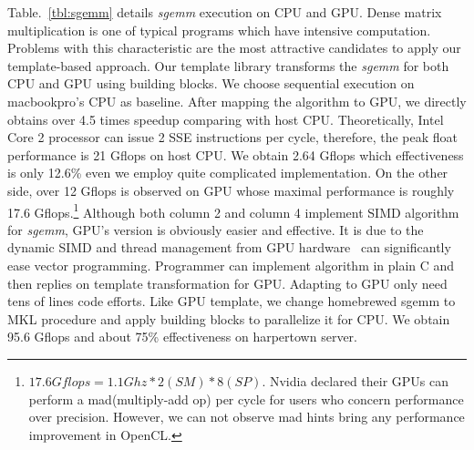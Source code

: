 Table.~\ref{tbl:sgemm} details \textit{sgemm} execution on CPU and GPU. Dense matrix
multiplication is one of  typical programs which have
intensive computation. Problems with this characteristic are the most
attractive candidates to apply our template-based approach.
Our template library transforms the \textit{sgemm} for both CPU and 
GPU using building blocks. We choose sequential execution on macbookpro's CPU as
baseline. After mapping the algorithm to GPU, we directly obtains over
4.5 times speedup comparing with host CPU. Theoretically,  Intel Core
2 processor can issue 2 SSE instructions per cycle,  therefore, the
peak float performance is 21 Gflops on host CPU. We obtain 2.64 Gflops which
effectiveness is only 12.6\% even we employ quite complicated
implementation. On the other side, over 12 Gflops is observed on GPU whose
maximal performance is roughly 17.6 Gflops.\footnote{$17.6Gflops = 1.1Ghz * 2(SM) *
  8(SP)$. Nvidia declared their GPUs can perform a mad(multiply-add
  op) per cycle  for users who concern performance over precision. However, we can
  not observe mad hints bring any performance improvement in OpenCL. }
Although both column 2 and column 4 implement SIMD algorithm for
\textit{sgemm}, GPU's version is obviously easier and effective. It is
due to the dynamic SIMD and thread management from GPU
hardware~\cite{Fatahalian08} can significantly ease vector programming. Programmer can
implement algorithm in plain C and then replies on template
transformation for GPU.  Adapting to GPU only need tens of lines code
efforts. Like GPU template, we change homebrewed sgemm to MKL
procedure and apply building blocks to parallelize it for CPU. We obtain 95.6 
Gflops and about 75\% effectiveness on harpertown server.


